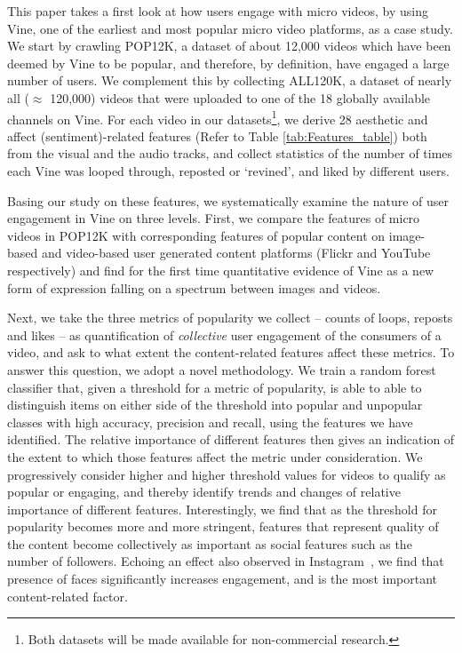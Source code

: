 This paper takes a first look at how users engage with micro videos, by using Vine, one of the earliest and most popular micro video platforms, as a case study.  %
We start by crawling POP12K, a dataset of about 12,000 videos which have been deemed by Vine to be popular, and therefore, by definition, have engaged a large number of users. We complement this by collecting ALL120K, a dataset of nearly all ($\approx$ 120,000)  videos that were uploaded to one of the 18 globally available channels on Vine. For each video in our datasets\footnote{Both datasets will be made available for non-commercial research.}, we derive 28 aesthetic and affect (sentiment)-related features (Refer to Table \ref{tab:Features_table}) both from the visual and the audio tracks, and collect statistics of the number of times each Vine was looped through, reposted or `revined', and liked by different users. 

Basing our study on these features, we systematically examine the nature of user engagement in Vine on three levels. First, we compare the features of micro videos in POP12K with corresponding features of popular content on image-based and video-based user generated content platforms (Flickr and YouTube respectively) and find for the first time quantitative evidence of Vine as a new form of expression falling on a spectrum between images and videos. 

Next, we take the three metrics of popularity we collect -- counts of loops, reposts and likes -- as quantification of \emph{collective} user engagement of the consumers of a video, and ask to what extent the content-related features affect these metrics. To answer this question, we adopt a novel methodology.
We train a random forest classifier that, given a threshold for a metric of popularity, is able to able to distinguish items on either side of the threshold into popular and unpopular classes  with high accuracy, precision and recall, using the features we have identified. The relative importance of different features then gives an indication of the extent to which those features affect the metric under consideration. We progressively consider higher and higher threshold values for videos to qualify as popular or engaging, and thereby identify trends and changes of relative importance of different features. Interestingly, we find that as the threshold for popularity becomes more and more stringent, features that represent quality of the content become collectively as important as social features such as the number of followers. Echoing an effect also observed in Instagram~\cite{bakhshi2014faces}, we find that presence of faces significantly increases engagement, and is the most important content-related factor.


